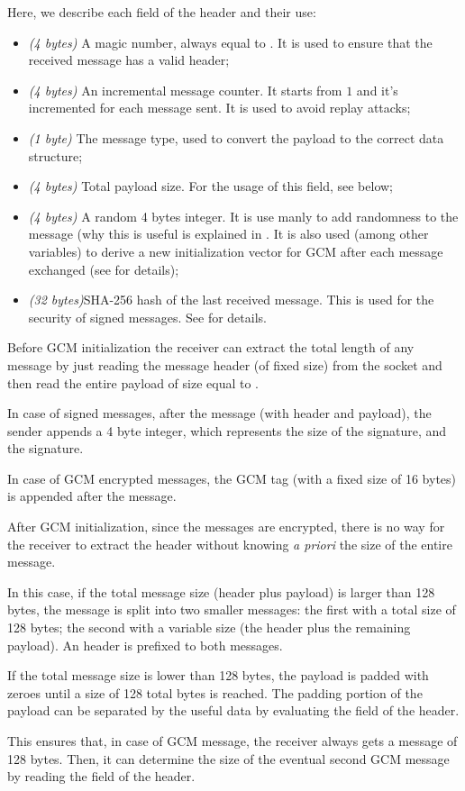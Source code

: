 Here, we describe each field of the header and their use:
\begin{itemize}
	\item[\standout{magic}] \emph{(4 bytes)} A magic number, always equal to
		.  It is used to ensure that the received message
		has a valid header;
	\item[\standout{counter}] \emph{(4 bytes)} An incremental message
		counter. It starts from \(1\) and it's incremented for each
		message sent. It is used to avoid replay attacks;
	\item[\standout{type}] \emph{(1 byte)} The message type, used to convert
		the payload to the correct data structure;
	\item[\standout{payload\_size}] \emph{(4 bytes)} Total payload size. For
		the usage of this field, see below;
	\item[\standout{nonce}] \emph{(4 bytes)} A random 4 bytes integer. It is
		use manly to add randomness to the message (why this is useful
		is explained in . It is also used (among
		other variables) to derive a new initialization vector for GCM
		after each message exchanged (see  for
		details);
	\item[\standout{prev\_hash}] \emph{(32 bytes)}SHA-256 hash of the last
		received message.  This is used for the security of signed
		messages. See  for details.
\end{itemize}

Before GCM initialization the receiver can extract the total length of any
message by just reading the message header (of fixed size) from the socket and
then read the entire payload of size equal to .

In case of signed messages, after the message (with header and payload), the
sender appends a 4 byte integer, which represents the size of the signature, and
the signature.

In case of GCM encrypted messages, the GCM tag (with a fixed size of 16 bytes)
is appended after the message.

After GCM initialization, since the messages are encrypted, there is no way for
the receiver to extract the header without knowing \emph{a priori} the size of
the entire message.

In this case, if the total message size (header plus payload) is larger than 128
bytes, the message is split into two smaller messages: the first with a total
size of 128 bytes; the second with a variable size (the header plus the
remaining payload). An header is prefixed to both messages.

If the total message size is lower than 128 bytes, the payload is padded with
zeroes until a size of 128 total bytes is reached. The padding portion of the
payload can be separated by the useful data by evaluating the
 field of the header.

This ensures that, in case of GCM message, the receiver always gets a message of
128 bytes. Then, it can determine the size of the eventual second GCM message by
reading the  field of the header.



